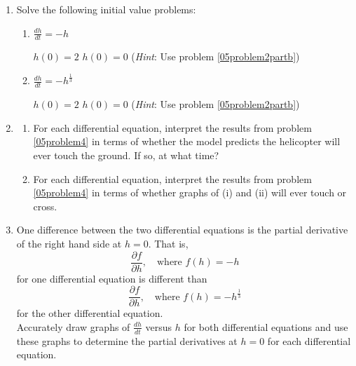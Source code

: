 \begin{enumerate}
\item Solve the following initial value problems: \label{05problem4}

\begin{enumerate}
\item $\displaystyle\frac{dh}{dt}=-h$

\begin{hnumerate}
\hitem $h(0) = 2$
\hitem $h(0) = 0$ (\textit{Hint}: Use problem \ref{05problem2partb}) \hspace{1in}
\end{hnumerate}
\vfill

\item $\displaystyle\frac{dh}{dt}=-h^{\frac{1}{3}}$
  			                                    
\begin{hnumerate}
\hitem $h(0) = 2$
\hitem $h(0) = 0$ (\textit{Hint}: Use problem \ref{05problem2partb}) \hspace{1in}
\end{hnumerate}
\end{enumerate}
\vfill

\item
\begin{enumerate}
\item For each differential equation, interpret the results from problem \ref{05problem4} in terms of whether the model predicts the helicopter will ever touch the ground. If so, at what time? \label{05problem5parta}
\vfill

\item For each differential equation, interpret the results from problem \ref{05problem4} in terms of whether graphs of (i) and (ii) will ever touch or cross. \label{05problem5partb}
\vfill
\end{enumerate}

\clearpage

\item	One difference between the two differential equations is the partial derivative of the right hand side at $h = 0$. That is,
\[
\frac{\partial f}{\partial h}, \quad \text{where } f(h)=-h
\]
for one differential equation is different than
\[
\frac{\partial f}{\partial h}, \quad \text{where } f(h)=-h^{\frac{1}{3}}
\]
for the other differential equation. \\
\vs
Accurately draw graphs of $\displaystyle\frac{dh}{dt}$ versus $h$ for both differential equations and use these graphs to determine the partial derivatives at $h = 0$ for each differential equation. \label{05problem6}
\end{enumerate}
\vfill

